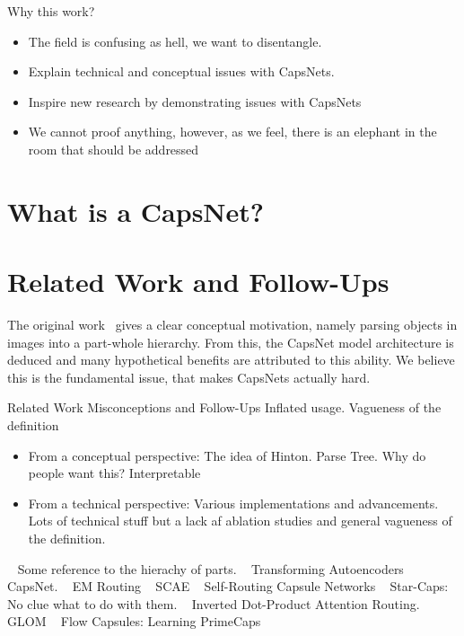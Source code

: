 \documentclass{article}
\begin{document}
Why this work?
\begin{itemize}
	\item The field is confusing as hell, we want to disentangle.
	\item Explain technical and conceptual issues with CapsNets.
	\item Inspire new research by demonstrating issues with CapsNets
	\item We cannot proof anything, however, as we feel, there is an elephant in the room that should be addressed
\end{itemize}

\section{What is a CapsNet?}

\section{Related Work and Follow-Ups}

The original work~\cite{nips/SabourFH17} gives a clear conceptual motivation, namely parsing objects in images into a part-whole hierarchy.
From this, the CapsNet model architecture is deduced and many hypothetical benefits are attributed to this ability.
We believe this is the fundamental issue, that makes CapsNets actually hard.

Related Work
Misconceptions and Follow-Ups
Inflated usage.
Vagueness of the definition
\begin{itemize}
	\item From a conceptual perspective: The idea of Hinton. Parse Tree. Why do people want this? Interpretable
	\item From a technical perspective: Various implementations and advancements. Lots of technical stuff but a lack af ablation studies and general vagueness of the definition.
\end{itemize}


~\cite{cogsci/Hinton79} Some reference to the hierachy of parts.
~\cite{icann/HintonKW11} Transforming Autoencoders
~\cite{nips/SabourFH17} CapsNet.
~\cite{iclr/HintonSF18} EM Routing
~\cite{nips/KosiorekSTH19} SCAE
~\cite{nips/HahnPK19} Self-Routing Capsule Networks
~\cite{nips/AhmedT19} Star-Caps: No clue what to do with them.
~\cite{iclr/TsaiSGS2} Inverted Dot-Product Attention Routing.
~\cite{corr/Hinton2021} GLOM
~\cite{icml/SabourTYHF21} Flow Capsules: Learning PrimeCaps
\end{document}
